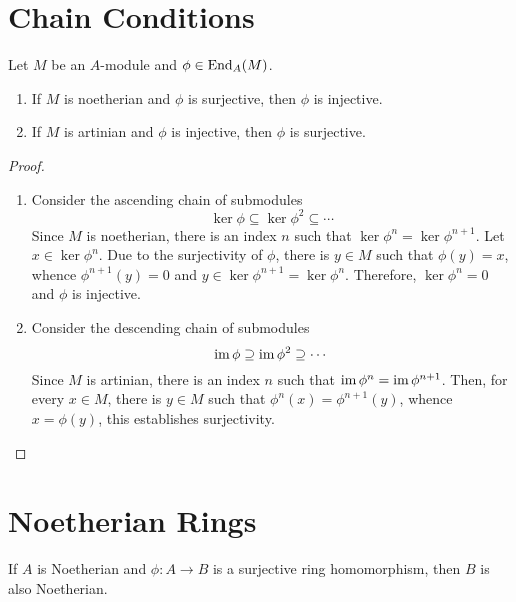 \section{Chain Conditions}

\begin{proposition}
    Let $M$ be an $A$-module and $\phi\in\operatorname{End}_A(M)$. 
    \begin{enumerate}[label=(\alph*)]
        \item If $M$ is noetherian and $\phi$ is surjective, then $\phi$ is injective.
        \item If $M$ is artinian and $\phi$ is injective, then $\phi$ is surjective.
    \end{enumerate}
\end{proposition}
\begin{proof}
\begin{enumerate}[label=(\alph*)]
\item Consider the ascending chain of submodules
\begin{equation*}
    \ker\phi\subseteq\ker\phi^2\subseteq\cdots
\end{equation*}
Since $M$ is noetherian, there is an index $n$ such that $\ker\phi^n = \ker\phi^{n + 1}$. Let $x\in\ker\phi^n$. Due to the surjectivity of $\phi$, there is $y\in M$ such that $\phi(y) = x$, whence $\phi^{n + 1}(y) = 0$ and $y\in\ker\phi^{n + 1} = \ker\phi^n$. Therefore, $\ker\phi^n = 0$ and $\phi$ is injective.

\item Consider the descending chain of submodules
\begin{equation*}
    \operatorname{im}\phi\supseteq\operatorname{im}\phi^2\supseteq\cdots
\end{equation*}
Since $M$ is artinian, there is an index $n$ such that $\operatorname{im}\phi^n = \operatorname{im}\phi^{n + 1}$. Then, for every $x\in M$, there is $y\in M$ such that $\phi^n(x) = \phi^{n + 1}(y)$, whence $x = \phi(y)$, this establishes surjectivity.
\end{enumerate}
\end{proof}

\section{Noetherian Rings}

\begin{lemma}
    If $A$ is Noetherian and $\phi: A\to B$ is a surjective ring homomorphism, then $B$ is also Noetherian.
\end{lemma}

